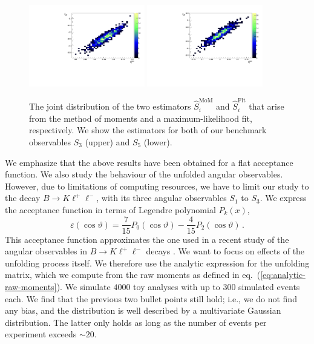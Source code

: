 \documentclass[aps,nofootinbib,preprintnumbers,prd,twocolumn]{revtex4-1}
\newcommand{\est}[1]{\widehat{#1}}
\newcommand{\refeq}[1]{eq.~(\ref{eq:#1})}
\renewcommand{\theta}{\vartheta}
\let\eps\varepsilon
\newcommand{\add}[1]{\textcolor{green!85!black}{#1}}
\begin{document}
\begin{figure}[t]
        \centering
            \includegraphics[width=0.45\textwidth]{figs/S5_scat.pdf}
            \includegraphics[width=0.45\textwidth]{figs/S9_scat.pdf}
            \caption{The joint distribution of the two estimators
                $\est{S}_i^\text{MoM}$ and $\est{S}_i^\text{Fit}$ that arise
                from the method of moments and a maximum-likelihood fit,
                respectively. We show the estimators for both of our benchmark
                observables $S_3$ (upper) and $S_5$ (lower).
            }
        \label{fig:correlation}
\end{figure}

\add{We emphasize that the above results have been obtained for a flat acceptance function.
We also study the behaviour of the unfolded angular observables. However, due to limitations of computing
resources, we have to limit our study to the decay $B\to K\ell^+\ell^-$, with its three angular observables
$S_1$ to $S_3$. We express the acceptance function in terms of Legendre polynomial $P_k(x)$,
\begin{equation}
    \eps(\cos\theta) = \frac{7}{15} P_0(\cos\theta) - \frac{4}{15} P_2(\cos\theta)\,.
\end{equation}
This acceptance function approximates the one used in a recent study of the angular observables in $B\to K\ell^+\ell^-$
decays \cite{Aaij:2014tfa}. We want to focus on effects of the unfolding process itself. We therefore
use the analytic expression for the unfolding matrix, which we compute from the raw moments as
defined in \refeq{analytic-raw-moments}. We simulate $4000$ toy analyses with up to $300$ simulated events each.
We find that the previous two bullet points still hold; i.e., we do not find any bias, and the distribution
is well described by a multivariate Gaussian distribution. The latter only holds as long as the number of events
per experiment exceeds $\sim 20$.
}
\end{document}
